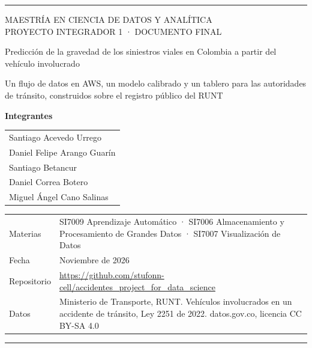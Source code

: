 \documentclass[11pt,a4paper]{article}
\begin{document}
\hypersetup{pageanchor=false}
\begin{titlepage}
  \thispagestyle{empty}
  {\color{senal}\rule{\textwidth}{2pt}}
  \vspace{2.2cm}

  {\small\color{suave}MAESTRÍA EN CIENCIA DE DATOS Y ANALÍTICA \\ PROYECTO INTEGRADOR 1 · DOCUMENTO FINAL}

  \vspace{0.8cm}
  {\fontsize{26}{31}\selectfont\bfseries\color{asfalto}\raggedright{}
  Predicción de la gravedad de los siniestros viales en Colombia a partir del vehículo involucrado\par}

  \vspace{0.6cm}
  {\large\color{suave}Un flujo de datos en AWS, un modelo calibrado y un tablero para las autoridades de tránsito, construidos sobre el registro público del RUNT\par}

  \vspace{2cm}
  {\large\bfseries\color{asfalto}Integrantes\par}
  \vspace{0.3cm}
  \begin{tabular}{@{}l@{}}
    Santiago Acevedo Urrego \\
    Daniel Felipe Arango Guarín \\
    Santiago Betancur \\
    Daniel Correa Botero \\
    Miguel Ángel Cano Salinas
  \end{tabular}

  \vfill
  \begin{tabularx}{\textwidth}{@{}lX@{}}
    \color{suave}Materias & SI7009 Aprendizaje Automático · SI7006 Almacenamiento y Procesamiento de Grandes Datos · SI7007 Visualización de Datos \\[0.3em]
    \color{suave}Fecha & Noviembre de 2026 \\[0.3em]
    \color{suave}Repositorio & \url{https://github.com/stufonn-cell/accidentes_project_for_data_science} \\[0.3em]
    \color{suave}Datos & Ministerio de Transporte, RUNT. Vehículos involucrados en un accidente de tránsito, Ley 2251 de 2022. datos.gov.co, licencia CC BY-SA 4.0
  \end{tabularx}
  \vspace{0.5cm}
  {\color{senal}\rule{\textwidth}{2pt}}
\end{titlepage}
\hypersetup{pageanchor=true}
\end{document}
